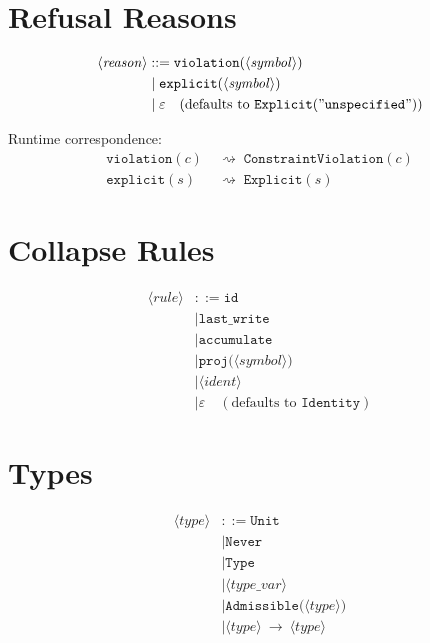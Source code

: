 \documentclass[12pt,oneside,openany]{book}
\theoremstyle{spherepop}
\theoremstyle{remarkstyle}
\begin{document}
\section{Refusal Reasons}

\begin{align*}
\langle \mathit{reason} \rangle
  &::= \mathtt{violation}\mathtt{(}\langle\mathit{symbol}\rangle\mathtt{)}\\
    &\mid \mathtt{explicit}\mathtt{(}\langle\mathit{symbol}\rangle\mathtt{)}\\
    &\mid \varepsilon \quad (\text{defaults to } \mathtt{Explicit("unspecified")})
\end{align*}

Runtime correspondence:
\begin{align*}
\mathtt{violation}(c) &\;\rightsquigarrow\; \texttt{ConstraintViolation}(c) \\
\mathtt{explicit}(s)  &\;\rightsquigarrow\; \texttt{Explicit}(s)
\end{align*}

\section{Collapse Rules}

\begin{align*}
\langle \mathit{rule} \rangle
  &::= \mathtt{id}\\
    &\mid \mathtt{last\_write}\\
    &\mid \mathtt{accumulate}\\
    &\mid \mathtt{proj}\mathtt{(}\langle\mathit{symbol}\rangle\mathtt{)}\\
    &\mid \langle\mathit{ident}\rangle\\
    &\mid \varepsilon \quad (\text{defaults to } \mathtt{Identity})
\end{align*}

\section{Types}

\begin{align*}
\langle \mathit{type} \rangle
  &::= \mathtt{Unit}\\
    &\mid \mathtt{Never}\\
    &\mid \mathtt{Type}\\
    &\mid \langle\mathit{type\_var}\rangle\\
    &\mid \mathtt{Admissible}\mathtt{(}\langle\mathit{type}\rangle\mathtt{)}\\
    &\mid \langle\mathit{type}\rangle\ \mathtt{\to}\ \langle\mathit{type}\rangle
\end{align*}
\end{document}
